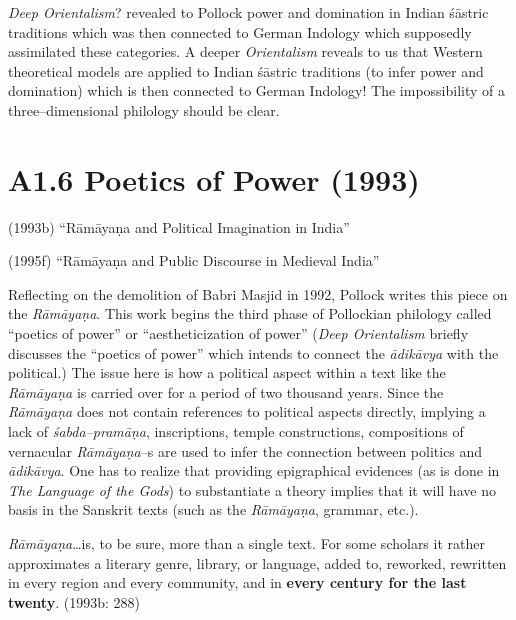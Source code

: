 \textit{Deep Orientalism}? revealed to Pollock power and domination in Indian śāstric traditions which was then connected to German Indology which supposedly assimilated these categories. A deeper\textit{ Orientalism} reveals to us that Western theoretical models are applied to Indian śāstric traditions (to infer power and domination) which is then connected to German Indology! The impossibility of a three–dimensional philology should be clear.

\vspace {-.4cm}

\section*{A1.6 Poetics of Power (1993)}

\vspace {-.2cm}

(1993b) “Rāmāyaṇa and Political Imagination in India”

(1995f) “Rāmāyaṇa and Public Discourse in Medieval India”

Reflecting on the demolition of Babri Masjid in 1992, Pollock writes this piece on the \textit{Rāmāyaṇa}. This work begins the third phase of Pollockian philology called “poetics of power” or “aestheticization of power” (\textit{Deep Orientalism} briefly discusses the “poetics of power” which intends to connect the \textit{ādikāvya }with the political.) The issue here is how a political aspect within a text like the \textit{Rāmāyaṇa} is carried over for a period of two thousand years. Since the \textit{Rāmāyaṇa} does not contain references to political aspects directly, implying a lack of \textit{śabda–pramāṇa}, inscriptions, temple constructions, compositions of vernacular \textit{Rāmāyaṇa}–s are used to infer the connection between politics and \textit{ādikāvya}. One has to realize that providing epigraphical evidences (as is done in \textit{The Language of the Gods}) to substantiate a theory implies that it will have no basis in the Sanskrit texts (such as the \textit{Rāmāyaṇa}, grammar, etc.).

\begin{myquote}
\textit{Rāmāyaṇa}…is, to be sure, more than a single text. For some scholars it rather approximates a literary genre, library, or language, added to, reworked, rewritten in every region and every community, and in \textbf{every century for the last twenty}. (1993b: 288)
\end{myquote}

